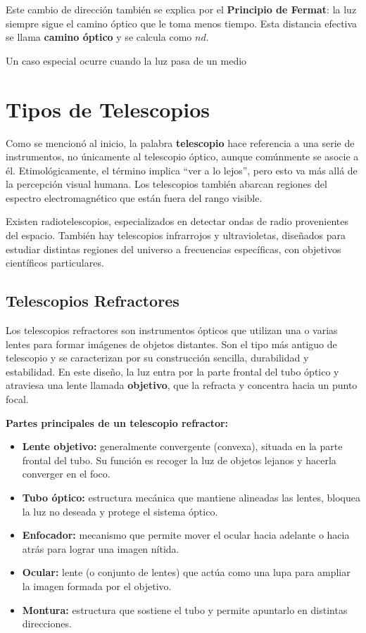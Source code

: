 Este cambio de dirección también se explica por el \textbf{Principio de Fermat}: la luz siempre sigue el camino óptico que le toma menos tiempo. Esta distancia efectiva se llama \textbf{camino óptico} y se calcula como $nd$.

Un caso especial ocurre cuando la luz pasa de un medio


\section{Tipos de Telescopios}

Como se mencionó al inicio, la palabra \textbf{telescopio} hace referencia a una serie de instrumentos, no únicamente al telescopio óptico, aunque comúnmente se asocie a él. Etimológicamente, el término implica “ver a lo lejos”, pero esto va más allá de la percepción visual humana. Los telescopios también abarcan regiones del espectro electromagnético que están fuera del rango visible.

Existen radiotelescopios, especializados en detectar ondas de radio provenientes del espacio. También hay telescopios infrarrojos y ultravioletas, diseñados para estudiar distintas regiones del universo a frecuencias específicas, con objetivos científicos particulares.


\subsection{Telescopios Refractores}

Los telescopios refractores son instrumentos ópticos que utilizan una o varias lentes para formar imágenes de objetos distantes. Son el tipo más antiguo de telescopio y se caracterizan por su construcción sencilla, durabilidad y estabilidad. En este diseño, la luz entra por la parte frontal del tubo óptico y atraviesa una lente llamada \textbf{objetivo}, que la refracta y concentra hacia un punto focal.

\textbf{Partes principales de un telescopio refractor:}
\begin{itemize}
	\item \textbf{Lente objetivo:} generalmente convergente (convexa), situada en la parte frontal del tubo. Su función es recoger la luz de objetos lejanos y hacerla converger en el foco.
	\item \textbf{Tubo óptico:} estructura mecánica que mantiene alineadas las lentes, bloquea la luz no deseada y protege el sistema óptico.
	\item \textbf{Enfocador:} mecanismo que permite mover el ocular hacia adelante o hacia atrás para lograr una imagen nítida.
	\item \textbf{Ocular:} lente (o conjunto de lentes) que actúa como una lupa para ampliar la imagen formada por el objetivo.
	\item \textbf{Montura:} estructura que sostiene el tubo y permite apuntarlo en distintas direcciones.
\end{itemize}


